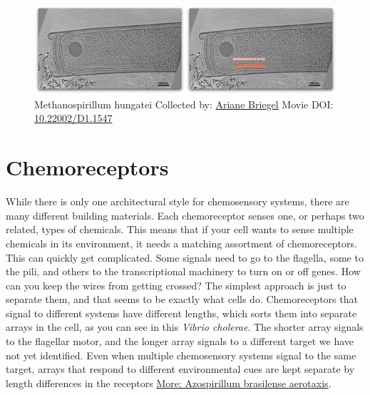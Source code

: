 \documentclass[]{tufte-book}
\begin{document}
\begin{figure}
\includegraphics{movie_stills/7_3} \caption[Methanospirillum hungatei Collected by:
\protect\hyperlink{ariane_briegel}{Ariane Briegel} Movie DOI:
\href{https://doi.org/10.22002/D1.1547}{10.22002/D1.1547}]{Methanospirillum hungatei Collected by:
\protect\hyperlink{ariane_briegel}{Ariane Briegel} Movie DOI:
\href{https://doi.org/10.22002/D1.1547}{10.22002/D1.1547}}\label{fig:7-3}
\end{figure}

\section{Chemoreceptors}\label{chemoreceptors}

While there is only one architectural style for chemosensory systems,
there are many different building materials. Each chemoreceptor senses
one, or perhaps two related, types of chemicals. This means that if your
cell wants to sense multiple chemicals in its environment, it needs a
matching assortment of chemoreceptors. This can quickly get complicated.
Some signals need to go to the flagella, some to the pili, and others to
the transcriptional machinery to turn on or off genes. How can you keep
the wires from getting crossed? The simplest approach is just to
separate them, and that seems to be exactly what cells do.
Chemoreceptors that signal to different systems have different lengths,
which sorts them into separate arrays in the cell, as you can see in
this \emph{Vibrio cholerae}. The shorter array signals to the flagellar
motor, and the longer array signals to a different target we have not
yet identified. Even when multiple chemosensory systems signal to the
same target, arrays that respond to different environmental cues are
kept separate by length differences in the receptors
\protect\hyperlink{Azospirillum_brasilense_aerotaxis}{More: Azospirillum
brasilense aerotaxis}.
\end{document}

